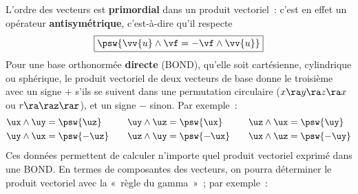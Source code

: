 \documentclass[../../main/main.tex]{subfiles}
\begin{document}
\begin{tcb*}
	L'ordre des vecteurs est \textbf{primordial} dans un produit vectoriel~:
	c'est en effet un opérateur \textbf{antisymétrique}, c'est-à-dire qu'il
	respecte
	\[\boxed{\psw{\vv{u}\wedge\vf = -\vf\wedge\vv{u}}}\]
	Pour une base orthonormée \textbf{directe} (BOND), qu'elle soit cartésienne,
	cylindrique ou sphérique, le produit vectoriel de deux vecteurs de base
	donne le troisième avec un signe $+$ s'ils se suivent dans une permutation
	circulaire ($x\ra y\ra z \ra x$ ou $r\ra\tt\ra z\ra r$), et un signe $-$
	sinon. Par exemple~:
	\begin{gather*}
		\begin{aligned}
			\ux\wedge\uy & = \psw{\uz}  \\
			\uy\wedge\ux & = \psw{-\uz}
		\end{aligned}
		\qquad
		\begin{aligned}
			\uy\wedge\uz & = \psw{\ux}  \\
			\uz\wedge\uy & = \psw{-\ux}
		\end{aligned}
		\qquad
		\begin{aligned}
			\uz\wedge\ux & = \psw{\uy}  \\
			\ux\wedge\uz & = \psw{-\uy}
		\end{aligned}
	\end{gather*}
	Ces données permettent de calculer n'importe quel produit vectoriel exprimé
	dans une BOND. En termes de composantes des vecteurs, on pourra déterminer
	le produit vectoriel avec la «~règle du gamma~»~; par exemple~:

\end{tcb*}
\end{document}
